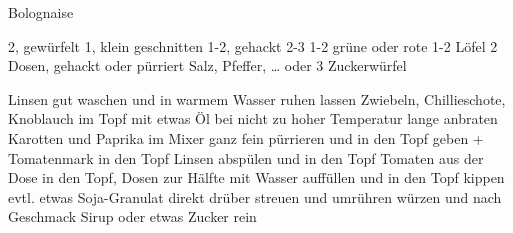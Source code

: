 \begin{recipe}{Bolognaise}

     2, gewürfelt
     1, klein geschnitten
     1-2, gehackt
     2-3
     1-2
     grüne oder rote
     1-2 Löfel
     2 Dosen, gehackt oder pürriert
     Salz, Pfeffer, \dots
     oder 3 Zuckerwürfel
    \ingredient{}
    \ingredient{}

    \fivestar
    \ingredient{}
    \ingredient{}

     Linsen gut waschen und in warmem Wasser ruhen lassen
     Zwiebeln, Chillieschote, Knoblauch im Topf mit etwas Öl bei nicht zu hoher Temperatur lange anbraten
     Karotten und Paprika im Mixer ganz fein pürrieren und in den Topf geben + Tomatenmark in den Topf
     Linsen abspülen und in den Topf
     Tomaten aus der Dose in den Topf, Dosen zur Hälfte mit Wasser auffüllen und in den Topf kippen
     evtl. etwas Soja-Granulat direkt drüber streuen und umrühren
     würzen und nach Geschmack Sirup oder etwas Zucker rein

\end{recipe}